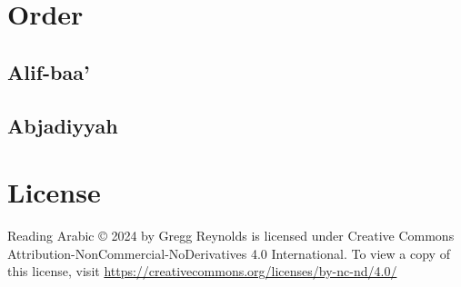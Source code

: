 \documentclass[11pt]{article}
\begin{document}
\section{Order}

\subsection{Alif-baa'}

\subsection{Abjadiyyah}

\appendix

\section{License}

Reading Arabic © 2024 by Gregg Reynolds is licensed under Creative
Commons Attribution-NonCommercial-NoDerivatives 4.0 International. To
view a copy of this license, visit
\href{https://creativecommons.org/licenses/by-nc-nd/4.0/}{https://creativecommons.org/licenses/by-nc-nd/4.0/}
\end{document}

